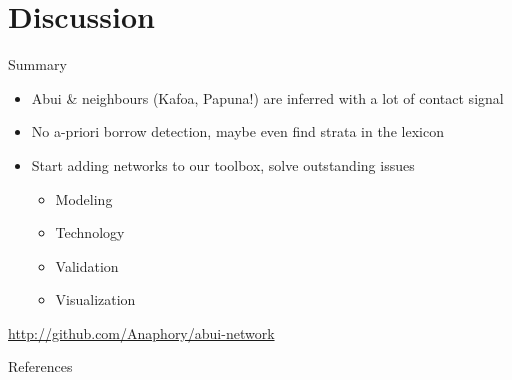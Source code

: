 \documentclass[
10pt,
]{beamer}
\begin{document}
\section{Discussion}
\begin{frame}{Summary}
  \begin{itemize}
  \item Abui \& neighbours (Kafoa, Papuna!) are inferred with a lot of contact signal
  \item No a-priori borrow detection, maybe even find strata in the lexicon
  \item Start adding networks to our toolbox, solve outstanding issues
    \begin{itemize}
    \item Modeling
    \item Technology
    \item Validation
    \item Visualization
    \end{itemize}
  \end{itemize}
  \url{http://github.com/Anaphory/abui-network}
\end{frame}
\begin{frame}[t,allowframebreaks]{References}
    \printbibliography
\end{frame}
\end{document}
